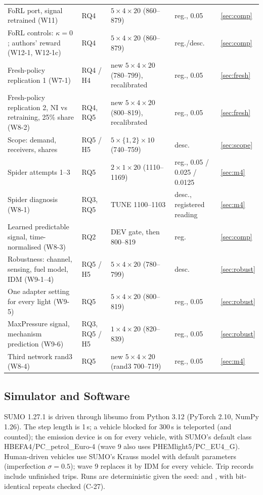 \begin{table}[t]
\begin{tabular}{@{}p{5.3cm}p{1.5cm}p{6.0cm}p{2.5cm}l@{}}
FoRL port, signal retrained (W11) & RQ4 & $5\times4\times20$ (860--879) & reg., 0.05 & \ref{sec:comp}\\
FoRL controls: $\kappa=0$; authors' reward (W12-1, W12-1c) & RQ4 & $5\times4\times20$ (860--879) & reg./desc. & \ref{sec:comp}\\
Fresh-policy replication 1 (W7-1) & RQ4 / H4 & new $5\times4\times20$ (780--799), recalibrated & reg., 0.05 & \ref{sec:fresh}\\
Fresh-policy replication 2, NI vs retraining, 25\% share (W8-2) & RQ4, RQ5 & new $5\times4\times20$ (800--819), recalibrated & reg., 0.05 & \ref{sec:fresh}\\
Scope: demand, receivers, shares & RQ5 / H5 & $5\times\{1,2\}\times10$ (740--759) & desc. & \ref{sec:scope}\\
Spider attempts 1--3 & RQ5 & $2\times1\times20$ (1110--1169) & reg., 0.05 / 0.025 / 0.0125 & \ref{sec:m4}\\
Spider diagnosis (W8-1) & RQ3, RQ5 & TUNE 1100--1103 & desc., registered reading & \ref{sec:m4}\\
Learned predictable signal, time-normalised (W8-3) & RQ2 & DEV gate, then 800--819 & reg. & \ref{sec:comp}\\
Robustness: channel, sensing, fuel model, IDM (W9-1--4) & RQ5 / H5 & $5\times4\times20$ (780--799) & desc. & \ref{sec:robust}\\
One adapter setting for every light (W9-5) & RQ5 & $5\times4\times20$ (800--819) & reg., 0.05 & \ref{sec:robust}\\
MaxPressure signal, mechanism prediction (W9-6) & RQ3, RQ5 / H5 & $1\times4\times20$ (820--839) & reg., 0.05 & \ref{sec:robust}\\
Third network rand3 (W8-4) & RQ5 & new $5\times4\times20$ (rand3 700--719) & reg., 0.05 & \ref{sec:m4}\\\bottomrule
\end{tabular}\end{table}

\subsection{Simulator and Software}
SUMO 1.27.1 \cite{lopez2018} is driven through libsumo from Python 3.12 (PyTorch 2.10, NumPy 1.26). The step length is 1\,s; a vehicle
blocked for 300\,s is teleported (and counted); the emission device is on for every vehicle, with SUMO's default class
HBEFA4/PC\_petrol\_Euro-4 \cite{krajzewicz2015} (wave 9 also uses PHEMlight5/PC\_EU4\_G). Human-driven vehicles use SUMO's Krauss model
\cite{krauss1998} with default parameters (imperfection $\sigma=0.5$); wave 9 replaces it by IDM \cite{treiber2000} for every vehicle.
Trip records include unfinished trips. Runs are deterministic given the seed:  and , with
bit-identical repeats checked (C-27).

